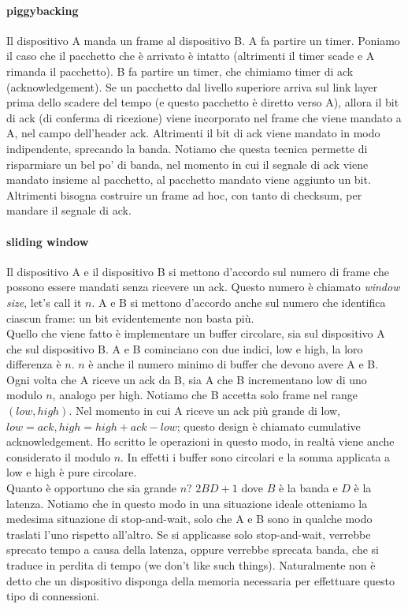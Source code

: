 \documentclass{article}
\begin{document}
\paragraph{piggybacking} Il dispositivo A manda un frame al dispositivo B. A fa
partire un timer. Poniamo il caso che il pacchetto che è arrivato è intatto
(altrimenti il timer scade e A rimanda il pacchetto). B fa partire un timer, che
chimiamo timer di ack (acknowledgement). Se un pacchetto dal livello superiore
arriva sul link layer prima dello scadere del tempo (e questo pacchetto è
diretto verso A), allora il bit di ack (di conferma di ricezione) viene
incorporato nel frame che viene mandato a A, nel campo dell'header ack.
Altrimenti il bit di ack viene mandato in modo indipendente, sprecando la banda.
Notiamo che questa tecnica permette di risparmiare un bel po' di banda, nel
momento in cui il segnale di ack viene mandato insieme al pacchetto, al
pacchetto mandato viene aggiunto un bit. Altrimenti bisogna costruire un frame
ad hoc, con tanto di checksum, per mandare il segnale di ack.

\paragraph{sliding window} Il dispositivo A e il dispositivo B si mettono
d'accordo sul numero di frame che possono essere mandati senza ricevere un ack.
Questo numero è chiamato \textit{window size}, let's call it $n$.
A e B si mettono d'accordo anche sul numero che identifica ciascun frame: un bit
evidentemente non basta più.\\
Quello che viene fatto è implementare un buffer circolare, sia sul dispositivo A
che sul dispositivo B. A e B cominciano con due indici, low e high, la loro
differenza è $n$. $n$ è anche il numero minimo di buffer che devono avere A e B.
Ogni volta che A riceve un ack da B, sia A che B incrementano low di uno modulo
$n$, analogo per high. Notiamo che B accetta solo frame nel range $(low, high)$.
Nel momento in cui A riceve un ack più grande di low, $low = ack, high = high +
	ack - low$; questo design è chiamato cumulative acknowledgement. Ho scritto le
operazioni in questo modo, in realtà viene anche considerato il modulo $n$. In
effetti i buffer sono circolari e la somma applicata a low e high è pure
circolare.\\

Quanto è opportuno che sia grande $n$? $2BD + 1$ dove $B$ è la banda e $D$ è la
latenza. Notiamo che in questo modo in una situazione ideale otteniamo la
medesima situazione di stop-and-wait, solo che A e B sono in qualche modo
traslati l'uno rispetto all'altro. Se si applicasse solo stop-and-wait, verrebbe
sprecato tempo a causa della latenza, oppure verrebbe sprecata banda, che si
traduce in perdita di tempo (we don't like such things). Naturalmente non è
detto che un dispositivo disponga della memoria necessaria per effettuare questo
tipo di connessioni.
\end{document}
